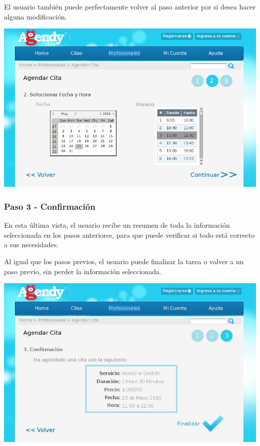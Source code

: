 \documentclass[letter, 10pt]{article}
\begin{document}
El usuario también puede perfectamente volver al paso anterior por si desea hacer alguna modificación.

\begin{center}
	\includegraphics[width=18cm]{images/3_2}
\end{center}
\newpage
\subsubsection{Paso 3 - Confirmación}
En esta última vista, el usuario recibe un resumen de toda la información seleccionada en los pasos anteriores,
para que puede verificar si todo está correcto a sus necesidades.

Al igual que los pasos previos, el usuario puede finalizar la tarea o volver a un paso previo,
sin perder la información seleccionada.

\begin{center}
	\includegraphics[width=18cm]{images/3_3}
\end{center}
\end{document}
